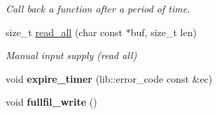 \begin{DoxyCompactItemize}
\begin{DoxyCompactList}\small\item\em Call back a function after a period of time. \end{DoxyCompactList}\item 
size\+\_\+t \hyperlink{classwebsocketpp_1_1transport_1_1debug_1_1connection_a36a7e0c517495dd8bdbecfa75c5a9d7b}{read\+\_\+all} (char const $\ast$buf, size\+\_\+t len)
\begin{DoxyCompactList}\small\item\em Manual input supply (read all) \end{DoxyCompactList}\item 
void {\bfseries expire\+\_\+timer} (lib\+::error\+\_\+code const \&ec)\hypertarget{classwebsocketpp_1_1transport_1_1debug_1_1connection_a05593a3cbd005194ea0e822631d629ce}{}\label{classwebsocketpp_1_1transport_1_1debug_1_1connection_a05593a3cbd005194ea0e822631d629ce}

\item 
void {\bfseries fullfil\+\_\+write} ()\hypertarget{classwebsocketpp_1_1transport_1_1debug_1_1connection_a53d8858b47eeccbd9d8bfd8b8e4f4a9a}{}\label{classwebsocketpp_1_1transport_1_1debug_1_1connection_a53d8858b47eeccbd9d8bfd8b8e4f4a9a}

\end{DoxyCompactItemize}
